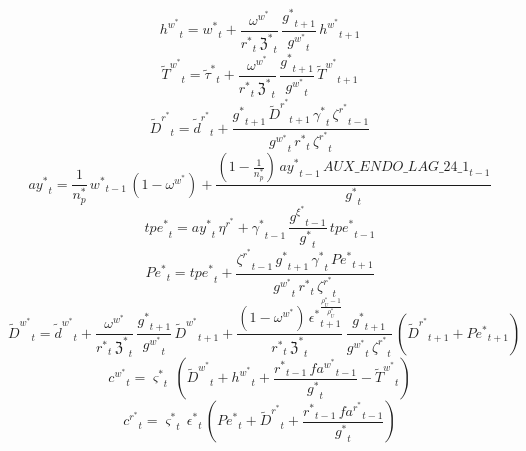 \begin{dmath}
{{h^w^*}}_{t}={{w^*}}_{t}+\frac{{{\omega^w^*}}}{{{r^*}}_{t}\, {{\mathfrak{Z}^*}}_{t}}\, \frac{{{g^*}}_{t+1}}{{{g^w^*}}_{t}}\, {{h^w^*}}_{t+1}
\end{dmath}
\begin{dmath}
{\tilde{T}^w^*}_{t}={\tilde{\tau}^*}_{t}+\frac{{{\omega^w^*}}}{{{r^*}}_{t}\, {{\mathfrak{Z}^*}}_{t}}\, \frac{{{g^*}}_{t+1}}{{{g^w^*}}_{t}}\, {\tilde{T}^w^*}_{t+1}
\end{dmath}
\begin{dmath}
{\tilde{D}^r^*}_{t}={\tilde{d}^r^*}_{t}+\frac{{{g^*}}_{t+1}\, {\tilde{D}^r^*}_{t+1}\, {{\gamma^*}}_{t}\, {{\zeta^r^*}}_{t-1}}{{{g^w^*}}_{t}\, {{r^*}}_{t}\, {{\zeta^r^*}}_{t}}
\end{dmath}
\begin{dmath}
{{ay^*}}_{t}=\frac{1}{{{n_p^*}}}\, {{w^*}}_{t-1}\, \left(1-{{\omega^w^*}}\right)+\frac{\left(1-\frac{1}{{{n_p^*}}}\right)\, {{ay^*}}_{t-1}\, {AUX\_ENDO\_LAG\_24\_1}_{t-1}}{{{g^*}}_{t}}
\end{dmath}
\begin{dmath}
{{tpe^*}}_{t}={{ay^*}}_{t}\, {{\eta^r^*}}+{{\gamma^*}}_{t-1}\, \frac{{{g^{\xi}^*}}_{t-1}}{{{g^*}}_{t}}\, {{tpe^*}}_{t-1}
\end{dmath}
\begin{dmath}
{{Pe^*}}_{t}={{tpe^*}}_{t}+\frac{{{\zeta^r^*}}_{t-1}\, {{g^*}}_{t+1}\, {{\gamma^*}}_{t}\, {{Pe^*}}_{t+1}}{{{g^w^*}}_{t}\, {{r^*}}_{t}\, {{\zeta^r^*}}_{t}}
\end{dmath}
\begin{dmath}
{\tilde{D}^w^*}_{t}={\tilde{d}^w^*}_{t}+\frac{{{\omega^w^*}}}{{{r^*}}_{t}\, {{\mathfrak{Z}^*}}_{t}}\, \frac{{{g^*}}_{t+1}}{{{g^w^*}}_{t}}\, {\tilde{D}^w^*}_{t+1}+\frac{\left(1-{{\omega^w^*}}\right)\, {{\epsilon^*}}_{t+1}^{\frac{{{\rho_U^*}}-1}{{{\rho_U^*}}}}}{{{r^*}}_{t}\, {{\mathfrak{Z}^*}}_{t}}\, \frac{{{g^*}}_{t+1}}{{{g^w^*}}_{t}\, {{\zeta^r^*}}_{t}}\, \left({\tilde{D}^r^*}_{t+1}+{{Pe^*}}_{t+1}\right)
\end{dmath}
\begin{dmath}
{{c^w^*}}_{t}={{\varsigma^*}}_{t}\, \left({\tilde{D}^w^*}_{t}+{{h^w^*}}_{t}+\frac{{{r^*}}_{t-1}\, {{fa^w^*}}_{t-1}}{{{g^*}}_{t}}-{\tilde{T}^w^*}_{t}\right)
\end{dmath}
\begin{dmath}
{{c^r^*}}_{t}={{\varsigma^*}}_{t}\, {{\epsilon^*}}_{t}\, \left({{Pe^*}}_{t}+{\tilde{D}^r^*}_{t}+\frac{{{r^*}}_{t-1}\, {{fa^r^*}}_{t-1}}{{{g^*}}_{t}}\right)
\end{dmath}
